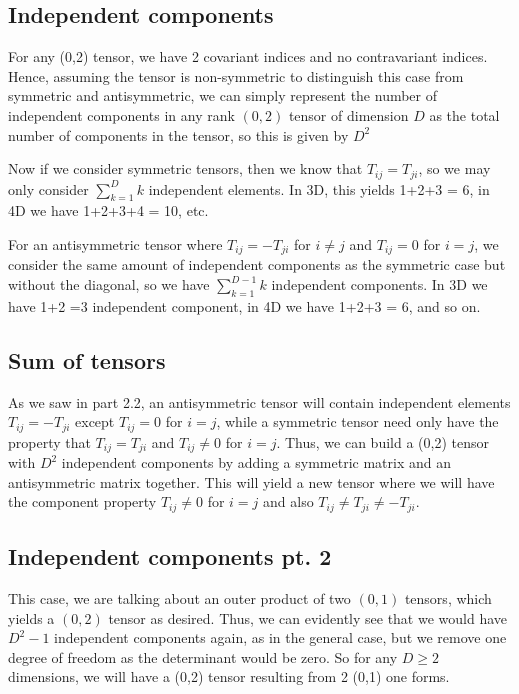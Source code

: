 \documentclass{article}
\begin{document}
		\pagebreak	
		\subsection{Independent components}
			For any (0,2) tensor, we have 2 covariant indices and no contravariant indices. Hence, assuming the tensor is non-symmetric to distinguish this case from symmetric and antisymmetric, we can simply represent the number of independent components in any rank $(0,2)$ tensor of dimension $D$ as the total number of components in the tensor, so this is given by $D^2$
			
			Now if we consider symmetric tensors, then we know that $T_{ij} = T_{ji}$, so we may only consider $\sum_{k=1}^{D} k$ independent elements. In 3D, this yields 1+2+3 = 6, in 4D we have 1+2+3+4 = 10, etc.
			
			For an antisymmetric tensor where $T_{ij} = -T_{ji}$ for $i\neq j$ and $T_{ij} = 0$ for $i=j$, we consider the same amount of independent components as the symmetric case but without the diagonal, so we have $\sum_{k=1}^{D-1} k$ independent components. In 3D we have 1+2 =3 independent component, in 4D we have 1+2+3 = 6, and so on.
		\subsection{Sum of tensors}
			As we saw in part 2.2, an antisymmetric tensor will contain independent elements $T_{ij} = -T_{ji}$ except $T_{ij} = 0$ for $i=j$, while a symmetric tensor need only have the property that $T_{ij} = T_{ji}$ and $T_{ij} \neq 0$ for $i=j$. Thus, we can build a (0,2) tensor with $D^2$ independent components by adding a symmetric matrix and an antisymmetric matrix together. This will yield a new tensor where we will have the component property $T_{ij} \neq 0$ for $i=j$ and also $T_{ij} \neq T_{ji} \neq -T_{ji}$.
		\subsection{Independent components pt. 2}
			This case, we are talking about an outer product of two $(0,1)$ tensors, which yields a $(0,2)$ tensor as desired. Thus, we can evidently see that we would have $D^2 - 1$ independent components again, as in the general case, but we remove one degree of freedom as the determinant would be zero. So for any $D \geq 2$ dimensions, we will have a (0,2) tensor resulting from 2 (0,1) one forms.
\end{document}
